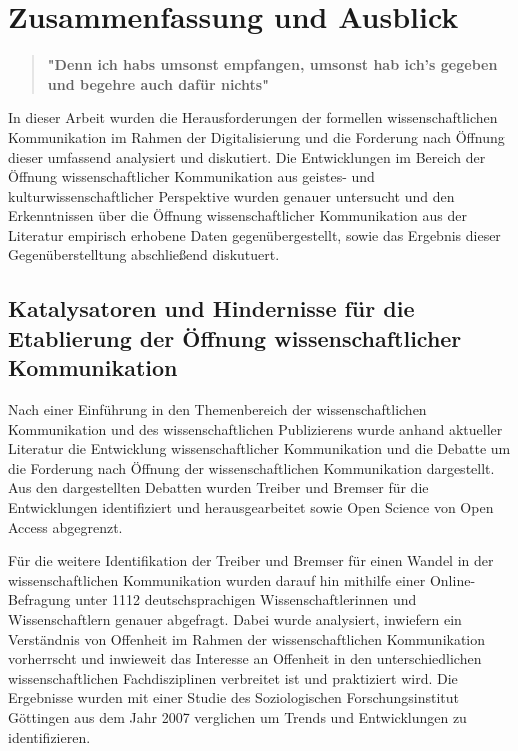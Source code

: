 \chapter{Zusammenfassung und Ausblick}

\begin{quote}
\textbf{"Denn ich habs umsonst empfangen, umsonst hab ich's gegeben und begehre auch dafür nichts"}
\end{quote} \cite{luther_1876}

In dieser Arbeit wurden die Herausforderungen der formellen wissenschaftlichen Kommunikation im Rahmen der Digitalisierung und die Forderung nach Öffnung dieser umfassend analysiert und diskutiert. Die Entwicklungen im Bereich der Öffnung wissenschaftlicher Kommunikation aus geistes- und kulturwissenschaftlicher Perspektive wurden genauer untersucht und den Erkenntnissen über die Öffnung wissenschaftlicher Kommunikation aus der Literatur empirisch erhobene Daten gegenübergestellt, sowie das Ergebnis dieser Gegenüberstelltung abschließend diskutuert.

\section{Katalysatoren und Hindernisse für die Etablierung der Öffnung wissenschaftlicher Kommunikation}

Nach einer Einführung in den Themenbereich der wissenschaftlichen Kommunikation und des wissenschaftlichen Publizierens wurde anhand aktueller Literatur die Entwicklung wissenschaftlicher Kommunikation und die Debatte um die Forderung nach Öffnung der wissenschaftlichen Kommunikation dargestellt. Aus den dargestellten Debatten wurden Treiber und Bremser für die Entwicklungen identifiziert und herausgearbeitet sowie Open Science von Open Access abgegrenzt.

Für die weitere Identifikation der Treiber und Bremser für einen Wandel in der wissenschaftlichen Kommunikation wurden darauf hin mithilfe einer Online-Befragung unter 1112 deutschsprachigen Wissenschaftlerinnen und Wissenschaftlern genauer abgefragt. Dabei wurde analysiert, inwiefern ein Verständnis von Offenheit im Rahmen der wissenschaftlichen Kommunikation vorherrscht und inwieweit das Interesse an Offenheit in den unterschiedlichen wissenschaftlichen Fachdisziplinen verbreitet ist und praktiziert wird. Die Ergebnisse wurden mit einer Studie des Soziologischen Forschungsinstitut Göttingen aus dem Jahr 2007 verglichen um Trends und Entwicklungen zu identifizieren.

